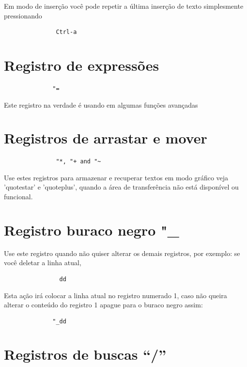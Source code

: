 \documentclass[10pt,a4paper,openany]{book}
\begin{document}
Em modo de inserção você pode repetir a última inserção de texto
simplesmente pressionando

\begin{verbatim}
			   Ctrl-a
\end{verbatim}

\section{Registro de expressões}
\label{Registro de expressões}

\begin{verbatim}
			  "=
\end{verbatim}

Este registro na verdade é usando em algumas funções avançadas

\section{Registros de arrastar e mover}
\label{Registros de arrastar e mover}

\begin{verbatim}
			   "*, "+ and "~
\end{verbatim}

Use estes registros para armazenar e recuperar textos em modo gráfico
veja 'quotestar' e 'quoteplus', quando a área de transferência não
está disponível ou funcional.

\section{Registro buraco negro "\_}
\label{Registro buraco negro}
Use este registro quando não quiser alterar os demais registros, por exemplo: se você deletar a linha atual,

\begin{verbatim}
				dd
\end{verbatim}

Esta ação irá colocar a linha atual no registro numerado 1, caso não
queira alterar o conteúdo do registro 1 apague para o buraco negro
assim:

\begin{verbatim}
			  "_dd
\end{verbatim}

\section{Registros de buscas ``/''}
\label{Registros de buscas ``/''}
\end{document}
